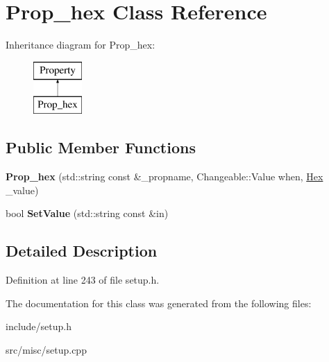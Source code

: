 \hypertarget{classProp__hex}{\section{Prop\-\_\-hex Class Reference}
\label{classProp__hex}
}
Inheritance diagram for Prop\-\_\-hex\-:\begin{figure}[H]
\begin{center}
\leavevmode
\includegraphics[height=2.000000cm]{classProp__hex}
\end{center}
\end{figure}
\subsection*{Public Member Functions}
\begin{DoxyCompactItemize}
\item 
\hypertarget{classProp__hex_a5a9df57c5efae0c495056cda181ccf40}{{\bfseries Prop\-\_\-hex} (std\-::string const \&\-\_\-propname, Changeable\-::\-Value when, \hyperlink{classHex}{Hex} \-\_\-value)}\label{classProp__hex_a5a9df57c5efae0c495056cda181ccf40}

\item 
\hypertarget{classProp__hex_ab1461b9f682fa0aac1e45d544905aaed}{bool {\bfseries Set\-Value} (std\-::string const \&in)}\label{classProp__hex_ab1461b9f682fa0aac1e45d544905aaed}

\end{DoxyCompactItemize}


\subsection{Detailed Description}


Definition at line 243 of file setup.\-h.



The documentation for this class was generated from the following files\-:\begin{DoxyCompactItemize}
\item 
include/setup.\-h\item 
src/misc/setup.\-cpp\end{DoxyCompactItemize}
